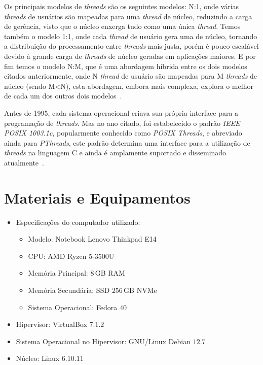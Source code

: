 \documentclass[
	12pt,				%
	oneside,   	        %
	a4paper,			%
	english,			%
	french,				%
	spanish,			%
	brazil,				%
	]{pacotes/abntex2}
\begin{document}
Os principais modelos de \textit{threads} são os seguintes modelos: N:1, onde várias \textit{threads} de usuários são mapeadas para uma \textit{thread} de núcleo, reduzindo a carga de gerência, visto que o núcleo enxerga tudo como uma única \textit{thread}. Temos também o modelo 1:1, onde cada \textit{thread} de  usuário gera uma de núcleo, tornando a distribuição do processamento entre \textit{threads} mais justa, porém é pouco escalável devido à grande carga de \textit{threads} de núcleo geradas em aplicações maiores. E por fim temos o modelo N:M, que é uma abordagem híbrida entre os dois modelos citados anteriormente, onde N \textit{thread} de usuário são mapeadas para M \textit{threads} de núcleo (sendo M<N), esta abordagem, embora mais complexa, explora o melhor de cada um dos outros dois modelos~\cite{maziero2019}.

Antes de 1995, cada sistema operacional criava sua própria interface para a programação de \textit{threads}. Mas no ano citado, foi estabelecido o padrão \textit{IEEE POSIX 1003.1c}, popularmente conhecido como \textit{POSIX Threads}, e abreviado ainda para \textit{PThreads}, este padrão determina uma interface para a utilização de \textit{threads} na linguagem C e ainda é amplamente suportado e disseminado atualmente~\cite{maziero2019}.

\section{Materiais e Equipamentos}
\label{sec:materiais}

\begin{itemize}
  \item Especificações do computador utilizado:
  \begin{itemize}
    \item Modelo: Notebook Lenovo Thinkpad E14
    \item CPU: AMD Ryzen $5$-$3500$U
    \item Memória Principal: $8$\,GB RAM
    \item Memória Secundária: SSD $256$\,GB NVMe
    \item Sistema Operacional: Fedora $40$
  \end{itemize}
  \item Hipervisor: VirtualBox $7.1.2$
  \item Sistema Operacional no Hipervisor: GNU/Linux Debian $12.7$
  \item Núcleo: Linux $6.10.11$
\end{itemize}
\end{document}
